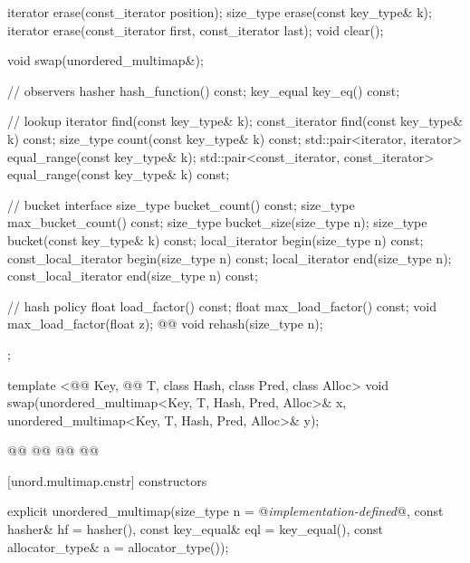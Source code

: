 \documentclass[american,twoside]{book}
\begin{document}
\begin{codeblock}
{{    iterator erase(const_iterator position);
    size_type erase(const key_type& k);
    iterator erase(const_iterator first, const_iterator last);
    void clear();

    void swap(unordered_multimap&);

    // observers
    hasher hash_function() const;
    key_equal key_eq() const;

    // lookup
    iterator       find(const key_type& k);
    const_iterator find(const key_type& k) const;
    size_type count(const key_type& k) const;
    std::pair<iterator, iterator>             equal_range(const key_type& k);
    std::pair<const_iterator, const_iterator> equal_range(const key_type& k) const;

    // bucket interface
    size_type bucket_count() const;
    size_type max_bucket_count() const;
    size_type bucket_size(size_type n);
    size_type bucket(const key_type& k) const;
    local_iterator begin(size_type n) const;
    const_local_iterator begin(size_type n) const;
    local_iterator end(size_type n);
    const_local_iterator end(size_type n) const;  

    // hash policy
    float load_factor() const;
    float max_load_factor() const;
    void max_load_factor(float z);
    @@ void rehash(size_type n);
  };

  template <@@ Key, @@ T, class Hash, class Pred, class Alloc>
    void swap(unordered_multimap<Key, T, Hash, Pred, Alloc>& x,
              unordered_multimap<Key, T, Hash, Pred, Alloc>& y);

  @@
    @@
      @@
        @@
}
\end{codeblock}

[unord.multimap.cnstr]{ constructors}

%
\begin{itemdecl}
explicit unordered_multimap(size_type n = @\textit{implementation-defined}@,
                            const hasher& hf = hasher(),
                            const key_equal& eql = key_equal(),
                            const allocator_type& a = allocator_type());
\end{itemdecl}
\end{document}
